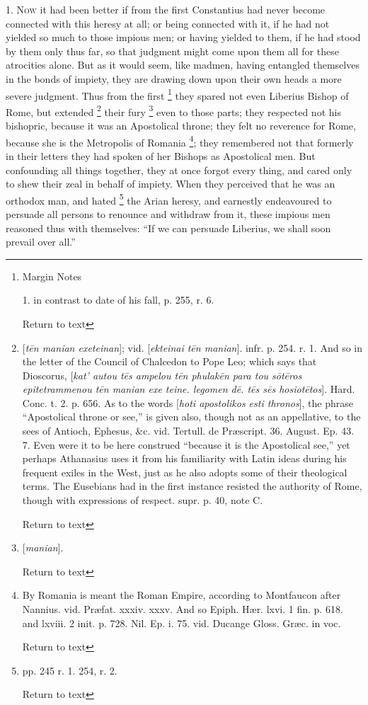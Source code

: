 1. N\textsc{ow} it had been better
if from the first Constantius had never become connected with this
heresy at all; or being connected with it, if he had not yielded so
much to those impious men; or having yielded to them, if he had stood
by them only thus far, so that judgment might come upon them all for
these atrocities alone. But as it would seem, like madmen, having
entangled themselves in the bonds of impiety, they are drawing down
upon their own heads a more severe judgment. Thus from the first \footnote{Margin Notes

1. in contrast to date of his fall, p. 255, r. 6.

Return to text} they spared not even Liberius Bishop of Rome, but extended \footnote{[\emph{t\={e}n manian exeteinan}]; vid. [\emph{ekteinai
t\={e}n manian}]. infr. p. 254. r. 1. And so in the letter of
the Council of Chalcedon to Pope Leo; which says that Dioscorus, [\emph{kat'
autou t\={e}s ampelou t\={e}n phulak\={e}n para tou s\={o}t\={e}ros
epitetrammenou t\={e}n manian exe teine. legomen d\={e}. t\={e}s
s\={e}s hosiot\={e}tos}]. Hard. Conc. t. 2. p. 656. As to the
words [\emph{hoti apostolikos esti thronos}], the phrase ``Apostolical
throne or see,'' is given also, though not as an appellative, to the
sees of Antioch, Ephesus, \&c. vid. Tertull. de Præscript. 36.
August. Ep. 43. 7. Even were it to be here construed ``because it is
the Apostolical see,'' yet perhaps Athanasius uses it from his
familiarity with Latin ideas during his frequent exiles in the West,
just as he also adopts some of their theological terms. The Eusebians
had in the first instance resisted the authority of Rome, though with
expressions of respect. supr. p. 40, note C.

Return to text} their fury \footnote{[\emph{manian}].

Return to text} even to those parts;
they respected not his bishopric, because it was an Apostolical
throne; they felt no reverence for Rome, because she is the Metropolis
of Romania \footnote{By Romania is meant the Roman Empire, according to Montfaucon after
Nannius. vid. Præfat. xxxiv. xxxv. And so Epiph. Hær. lxvi. 1 fin.
p. 618. and lxviii. 2 init. p. 728. Nil. Ep. i. 75. vid. Ducange
Gloss. Græc. in voc.

Return to text}; they remembered not that
formerly in their letters they had spoken of her Bishops as
Apostolical men. But confounding all things together, they at once
forgot every thing, and cared only to shew their zeal in behalf of
impiety. When they perceived that he was an orthodox man, and hated \footnote{pp. 245 r. 1. 254, r. 2.

Return to text} the Arian heresy, and earnestly endeavoured to persuade all persons
to renounce and withdraw from it, these impious men reasoned thus with
themselves: ``If we can persuade Liberius, we shall soon prevail over
all.''

